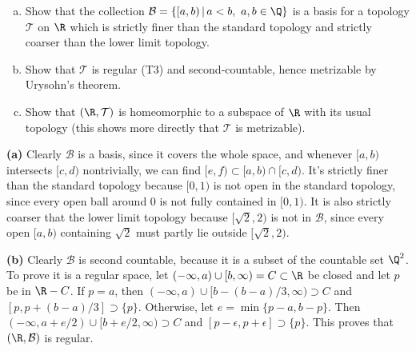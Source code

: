 \documentclass[11pt,letterpaper]{article}
\begin{document}
\begin{problem}\noindent
    \begin{enumerate}[(a)]
        \item Show that the collection $\mathcal{B}=\{[a,b)\,|\,a<b,\ a,b\in\Q\}$ is a basis for a topology $\mathcal{T}$ on $\R$ which is strictly finer than the standard topology and strictly coarser than the lower limit topology. 
        \item Show that $\mathcal{T}$ is regular (T3) and second-countable, hence metrizable by Urysohn's theorem.
        \item Show that $(\R,\mathcal{T})$ is homeomorphic to a subspace of $\R$ with its usual topology (this shows more directly that $\mathcal{T}$ is metrizable).
    \end{enumerate}

\end{problem}

\begin{solution}
    \textbf{(a)} Clearly $\mathcal{B}$ is a basis, since it covers the whole space, and whenever $[a,b)$ intersects $[c,d)$ nontrivially, we can find $[e,f)\subset [a,b)\cap [c,d)$. It's strictly finer than the standard topology because $[0,1)$ is not open in the standard topology, since every open ball around $0$ is not fully contained in $[0,1)$. It is also strictly coarser that the lower limit topology because $[\sqrt{2},2)$ is not in $\mathcal{B}$, since every open $[a,b)$ containing $\sqrt{2}$ must partly lie outside $[\sqrt{2},2)$.     
    
    \textbf{(b)} Clearly $\mathcal{B}$ is second countable, because it is a subset of the countable set $\Q^2$. To prove it is a regular space, let $(-\infty, a)\cup [b,\infty) = C\subset \R$ be closed and let $p$ be in $\R-C$. If $p=a$, then $(-\infty, a)\cup [b-(b-a) /3,\infty)\supset C$ and $[p,p+(b-a) /3]\supset \{p\}$. Otherwise, let $e=\min\{p-a, b-p\}$. Then $(-\infty,a+e /2)\cup[b+e /2, \infty)\supset C$ and $[p-\epsilon, p+\epsilon]\supset \{p\}$. This proves that $(\R,\mathcal{B})$ is regular. 
\end{solution}
\end{document}

